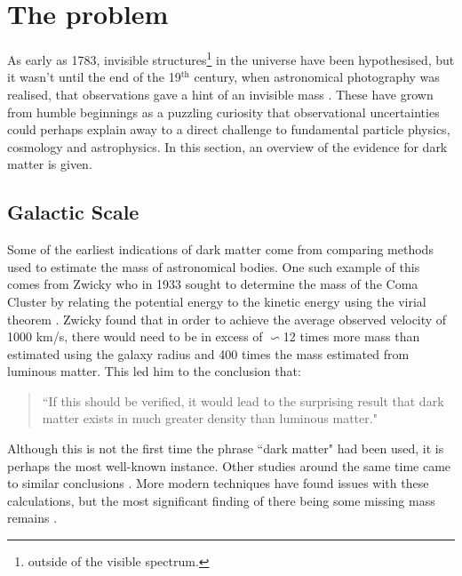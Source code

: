 \section{The problem}

\par
As early as 1783, invisible structures\footnote{outside of the visible spectrum.} in the universe have been hypothesised, but it wasn't until the end of the 19$^{\text{th}}$ century, when astronomical photography was realised, that observations gave a hint of an invisible mass \cite{History_Of_Dark_Matter_2018_ref}.
These have grown from humble beginnings as a puzzling curiosity that observational uncertainties could perhaps explain away to a direct challenge to fundamental particle physics, cosmology and astrophysics.
In this section, an overview of the evidence for dark matter is given.

%
%


\subsection{Galactic Scale}

\par
Some of the earliest indications of dark matter come from comparing methods used to estimate the mass of astronomical bodies.
One such example of this comes from Zwicky who in 1933 sought to determine the mass of the Coma Cluster by relating the potential energy to the kinetic energy using the virial theorem \cite{Fritz_Zwicky_1933_ref}.
Zwicky found that in order to achieve the average observed velocity of 1000 km/s, there would need to be in excess of $\backsim$12 times more mass than estimated using the galaxy radius and 400 times the mass estimated from luminous matter.
This led him to the conclusion that:
\begin{quote}
``If this should be verified, it would lead to the surprising result that dark matter
exists in much greater density than luminous matter."
\end{quote}
Although this is not the first time the phrase ``dark matter" had been used, it is perhaps the most well-known instance.
Other studies around the same time came to similar conclusions \cite{hubble_and_co_viral_theorem_ref}.
More modern techniques have found issues with these calculations, but the most significant finding of there being some missing mass remains \cite{a_second_history_of_dark_matter_ref}.

